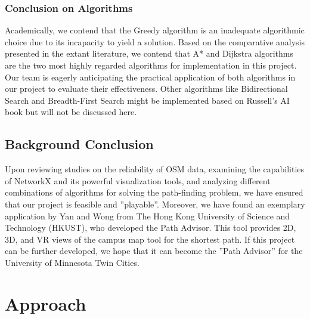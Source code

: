 \documentclass[12pt]{article}
\begin{document}
\subsubsection{Conclusion on Algorithms}

Academically, we contend that the Greedy algorithm is an inadequate algorithmic choice due to its incapacity to yield a solution. Based on the comparative analysis presented in the extant literature, we contend that A* and Dijkstra algorithms are the two most highly regarded algorithms for implementation in this project. Our team is eagerly anticipating the practical application of both algorithms in our project to evaluate their effectiveness. Other algorithms like Bidirectional Search and Breadth-First Search might be implemented based on Russell’s AI book \cite{Russell_Norvig_2021} but will not be discussed here.

\subsection{Background Conclusion}

Upon reviewing studies on the reliability of OSM data, examining the capabilities of NetworkX and its powerful visualization tools, and analyzing different combinations of algorithms for solving the path-finding problem, we have ensured that our project is feasible and ”playable”. Moreover, we have found an exemplary application by Yan and Wong from The Hong Kong University of Science and Technology (HKUST), who developed the Path Advisor\cite{Yan_Wong_2021}. This tool provides 2D, 3D, and VR views of the campus map tool for the shortest path. If this project can be further developed, we hope that it can become the ”Path Advisor” for the University of Minnesota Twin Cities.


\section{Approach}
\end{document}
